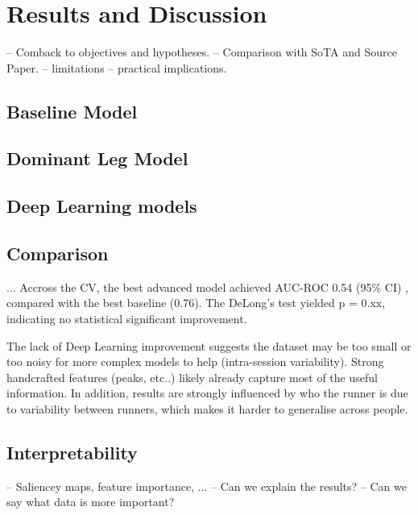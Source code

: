 \chapter{Results and Discussion}\label{chap:results-discussion}
-- Comback to objectives and hypotheses.
-- Comparison with SoTA and Source Paper.
-- limitations
-- practical implications.

\section{Baseline Model}\label{sec:results-baselines}

\section{Dominant Leg Model}\label{sec:results-dominant-leg}  %

\section{Deep Learning models}\label{sec:results-deep-learning}



\section{Comparison}\label{sec:results-comparison}
... Accross the CV, the best advanced model achieved AUC-ROC 0.54 (95\% CI) %
, compared with the best baseline (0.76). The DeLong's test yielded p = 0.xx, indicating no statistical significant improvement.

The lack of Deep Learning improvement suggests the dataset may be too small or too noisy for more complex models to help (intra-session variability). Strong handcrafted features (peaks, etc..) likely already capture most of the useful information. In addition, results are strongly influenced by who the runner is due to variability between runners, which makes it harder to generalise across people.

\section{Interpretability}\label{sec:results-interpretability}
-- Saliencey maps, feature importance, ...
-- Can we explain the results?
-- Can we say what data is more important?